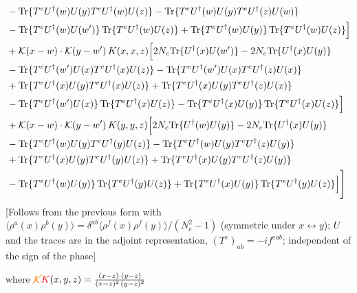 \documentclass[9pt]{article}
\numberwithin{equation}{section}
\begin{document}
\begin{align}
&-{\rm Tr}\{T^eU^\dagger(w)U(y)T^eU^\dagger(w)U(z)\}-{\rm Tr}\{T^eU^\dagger(w)U(y)T^eU^\dagger(z)U(w)\}\notag\\
&-{\rm Tr}\{T^eU^\dagger(w)U(w')\}\,{\rm Tr}\{T^eU^\dagger(w)U(z)\}+{\rm Tr}\{T^eU^\dagger(w)U(y)\}\,{\rm Tr}\{T^eU^\dagger(w)U(z)\}\Big]\notag\\
&+\mathcal K(x-w)\cdot\mathcal K(y-w')\,K(x,x,z)\Big[2 N_{c}{\rm Tr}\{U^\dagger(x)U(w')\}-2 N_{c}{\rm Tr}\{U^\dagger(x)U(y)\}\notag\\
&-{\rm Tr}\{T^eU^\dagger(w')U(x)T^eU^\dagger(x)U(z)\}-{\rm Tr}\{T^eU^\dagger(w')U(x)T^eU^\dagger(z)U(x)\}\notag\\
&+{\rm Tr}\{T^eU^\dagger(x)U(y)T^eU^\dagger(x)U(z)\}+{\rm Tr}\{T^eU^\dagger(x)U(y)T^eU^\dagger(z)U(x)\}\notag\\
&-{\rm Tr}\{T^eU^\dagger(w')U(x)\}\,{\rm Tr}\{T^eU^\dagger(x)U(z)\}-{\rm Tr}\{T^eU^\dagger(x)U(y)\}\,{\rm Tr}\{T^eU^\dagger(x)U(z)\}\Big]\notag\\
&+\mathcal K(x-w)\cdot\mathcal K(y-w')\,K(y,y,z)\Big[2 N_{c}{\rm Tr}\{U^\dagger(w)U(y)\}-2 N_{c}{\rm Tr}\{U^\dagger(x)U(y)\}\notag\\
&-{\rm Tr}\{T^eU^\dagger(w)U(y)T^eU^\dagger(y)U(z)\}-{\rm Tr}\{T^eU^\dagger(w)U(y)T^eU^\dagger(z)U(y)\}\notag\\
&+{\rm Tr}\{T^eU^\dagger(x)U(y)T^eU^\dagger(y)U(z)\}+{\rm Tr}\{T^eU^\dagger(x)U(y)T^eU^\dagger(z)U(y)\}\notag\\
&-{\rm Tr}\{T^eU^\dagger(w)U(y)\}\,{\rm Tr}\{T^eU^\dagger(y)U(z)\}+{\rm Tr}\{T^eU^\dagger(x)U(y)\}\,{\rm Tr}\{T^eU^\dagger(y)U(z)\}\Big]\Bigg]
\end{align} {\color{red}[Follows from the previous form with $\langle\rho^{a}(x)\rho^{b}(y)\rangle=\delta^{ab}\langle\rho^{f}(x)\rho^{f}(y)\rangle/(N_c^{2}-1)$ (symmetric under $x\leftrightarrow y$); $U$ and the traces are in the adjoint representation, $(T^{e})_{ab}=-if^{eab}$; independent of the sign of the phase]}\par\noindent 
where ${\color{orange}\cancel{\mathcal{K}}}{\color{red}K}(x,y,z) = \frac{(x-z)\cdot (y-z)}{(x-z)^{2}\,(y-z)^{2}}$
\end{document}
